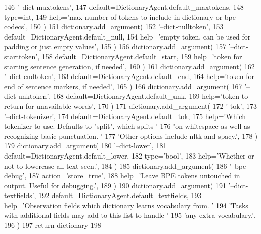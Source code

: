 \begin{DoxyCode}
146             \textcolor{stringliteral}{'--dict-maxtokens'},
147             default=DictionaryAgent.default\_maxtokens,
148             type=int,
149             help=\textcolor{stringliteral}{'max number of tokens to include in dictionary or bpe codecs'},
150         )
151         dictionary.add\_argument(
152             \textcolor{stringliteral}{'--dict-nulltoken'},
153             default=DictionaryAgent.default\_null,
154             help=\textcolor{stringliteral}{'empty token, can be used for padding or just empty values'},
155         )
156         dictionary.add\_argument(
157             \textcolor{stringliteral}{'--dict-starttoken'},
158             default=DictionaryAgent.default\_start,
159             help=\textcolor{stringliteral}{'token for starting sentence generation, if needed'},
160         )
161         dictionary.add\_argument(
162             \textcolor{stringliteral}{'--dict-endtoken'},
163             default=DictionaryAgent.default\_end,
164             help=\textcolor{stringliteral}{'token for end of sentence markers, if needed'},
165         )
166         dictionary.add\_argument(
167             \textcolor{stringliteral}{'--dict-unktoken'},
168             default=DictionaryAgent.default\_unk,
169             help=\textcolor{stringliteral}{'token to return for unavailable words'},
170         )
171         dictionary.add\_argument(
172             \textcolor{stringliteral}{'-tok'},
173             \textcolor{stringliteral}{'--dict-tokenizer'},
174             default=DictionaryAgent.default\_tok,
175             help=\textcolor{stringliteral}{'Which tokenizer to use. Defaults to "split", which splits '}
176             \textcolor{stringliteral}{'on whitespace as well as recognizing basic punctuation. '}
177             \textcolor{stringliteral}{'Other options include nltk and spacy.'},
178         )
179         dictionary.add\_argument(
180             \textcolor{stringliteral}{'--dict-lower'},
181             default=DictionaryAgent.default\_lower,
182             type=\textcolor{stringliteral}{'bool'},
183             help=\textcolor{stringliteral}{'Whether or not to lowercase all text seen.'},
184         )
185         dictionary.add\_argument(
186             \textcolor{stringliteral}{'--bpe-debug'},
187             action=\textcolor{stringliteral}{'store\_true'},
188             help=\textcolor{stringliteral}{'Leave BPE tokens untouched in output. Useful for debugging.'},
189         )
190         dictionary.add\_argument(
191             \textcolor{stringliteral}{'--dict-textfields'},
192             default=DictionaryAgent.default\_textfields,
193             help=\textcolor{stringliteral}{'Observation fields which dictionary learns vocabulary from. '}
194             \textcolor{stringliteral}{'Tasks with additional fields may add to this list to handle '}
195             \textcolor{stringliteral}{'any extra vocabulary.'},
196         )
197         \textcolor{keywordflow}{return} dictionary
198 
\end{DoxyCode}

